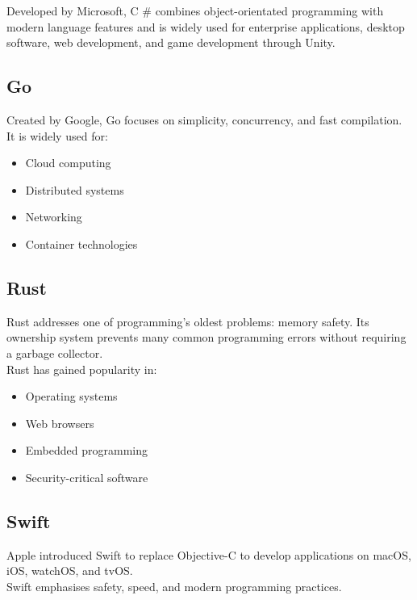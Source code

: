 Developed by Microsoft, C \# combines object-orientated programming with modern language features and is widely used for enterprise applications, desktop software, web development, and game development through Unity.

\subsection{Go}

Created by Google, Go focuses on simplicity, concurrency, and fast compilation.\\

It is widely used for:

\begin{itemize}
    \item Cloud computing
    \item Distributed systems
    \item Networking
    \item Container technologies
\end{itemize}

\subsection{Rust}

Rust addresses one of programming's oldest problems: memory safety. Its ownership system prevents many common programming errors without requiring a garbage collector.\\

Rust has gained popularity in:

\begin{itemize}
    \item Operating systems
    \item Web browsers
    \item Embedded programming
    \item Security-critical software
\end{itemize}

\subsection{Swift}

Apple introduced Swift to replace Objective-C to develop applications on macOS, iOS, watchOS, and tvOS.\\

Swift emphasises safety, speed, and modern programming practices.

